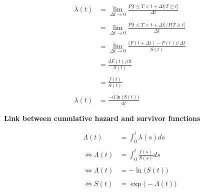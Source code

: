 \documentclass[
]{book}
\begin{document}
\begin{equation}    
  \begin{aligned}
  \lambda(t) & = \lim_{\Delta t \to 0} \frac{P\big[t \leq T < t + \Delta t | T \geq t \big]}{\Delta t} \\\\
  & = \lim_{\Delta t \to 0} \frac{P\big[t \leq T < t + \Delta t \big] / P\big[T \geq t  \big]}{\Delta t} \\\\
  & = \lim_{\Delta t \to 0} \frac{\big(F(t+\Delta t)-F(t)\big) / \Delta t}{S(t)} \\\\
  & = \frac{\text{d} F(t) / \text{d} t}{S(t)} \\\\
  & = \frac{f(t)}{S(t)} \\\\
  \lambda(t) & = \frac{-\text{d} \ln \big(S(t)\big)}{\text{d} t}
  \end{aligned}
  \label{eq:hazfunproof}
\end{equation}

\textbf{Link between cumulative hazard and survivor functions}

\begin{equation}
  \begin{aligned}
  \Lambda(t)      & = \int_{0}^{t} \lambda(s)ds \\\\
  \iff \Lambda(t) & = \int_{0}^{t} \frac{f(s)}{S(s)}ds \\\\
  \iff \Lambda(t) & = -\ln \big(S(t)\big) \\\\
  \iff S(t)       & = \exp \big(-\Lambda(t)\big)
  \end{aligned}
  \label{eq:linksurvcumhaz}
\end{equation}

  
\end{document}
